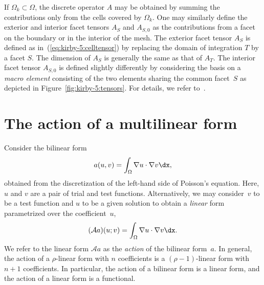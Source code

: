 If $\Omega_k \subset \Omega$, the discrete operator $A$ may be
obtained by summing the contributions only from the cells covered by
$\Omega_k$. One may similarly define the exterior and interior facet
tensors $A_S$ and $A_{S,0}$ as the contributions from a facet on the
boundary or in the interior of the mesh. The exterior facet tensor
$A_S$ is defined as in~(\ref{eq:kirby-5:celltensor}) by replacing the
domain of integration $T$ by a facet $S$. The dimension of $A_S$ is
generally the same as that of $A_T$. The interior facet tensor
$A_{S,0}$ is defined slightly differently by considering the basis on
a \emph{macro element} consisting of the two elements sharing the
common facet~$S$ as depicted in Figure~\ref{fig:kirby-5:tensors}. For
details, we refer to~\citet{OelgaardLoggWells2008}.

\section{The action of a multilinear form}

Consider the bilinear form
\begin{equation}
  a(u, v) = \int_{\Omega} \nabla u \cdot \nabla v \dx,
\end{equation}
obtained from the discretization of the left-hand side of Poisson's
equation. Here, $u$ and $v$ are a pair of trial and test functions.
Alternatively, we may consider~$v$ to be a test function and $u$ to be
a given solution to obtain a \emph{linear} form parametrized over the
coefficient~$u$,
\begin{equation}
  (\mathcal{A} a) (u; v) = \int_{\Omega} \nabla u \cdot \nabla v \dx.
\end{equation}
We refer to the linear form $\mathcal{A}a$ as the \emph{action} of the
bilinear form~$a$. In general, the action of a $\rho$-linear form with
$n$ coefficients is a $(\rho-1)$-linear form with $n+1$ coefficients.
In particular, the action of a bilinear form is a linear form, and the
action of a linear form is a functional.

